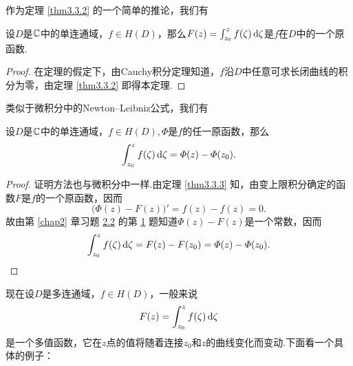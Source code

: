 作为定理 \ref{thm3.3.2} 的一个简单的推论，我们有
\begin{theorem}\label{thm3.3.3}
  设$D$是$\mathbb C$中的单连通域，$f\in H(D)$，那么$F(z)=\int_{z_0}^zf(\zeta)\mathop{}\!\mathrm{d} \zeta$是$f$在$D$中的一个原函数.
\end{theorem}
\begin{proof}
  在定理的假定下，由Cauchy积分定理知道，$f$沿$D$中任意可求长闭曲线的积分为零，由定理 \ref{thm3.3.2} 即得本定理.
\end{proof}

类似于微积分中的Newton--Leibniz公式，我们有
\begin{theorem}\label{thm3.3.4}
  设$D$是$\mathbb C$中的单连通域，$f\in H(D),\varPhi$是$f$的任一原函数，那么
  \[
    \int_{z_0}^zf(\zeta)\mathop{}\!\mathrm{d} \zeta = \varPhi(z)-\varPhi(z_0).
  \]
\end{theorem}
\begin{proof}
  证明方法也与微积分中一样.由定理 \ref{thm3.3.3} 知，由变上限积分确定的函数$F$是$f$的一个原函数，因而
  \[
    \big(\varPhi(z) - F(z)\big)' = f(z) - f(z) = 0.
  \]
  故由第 \ref{chap2} 章习题 \hyperlink{xiti2.2}{2.2} 的第 \hyperlink{xiti2.2.1}{1} 题知道$\varPhi(z)-F(z)$是一个常数，因而
  \begin{equation*}
    \int_{z_0}^zf(\zeta)\mathop{}\!\mathrm{d} \zeta = F(z) - F(z_0) = \varPhi(z) - \varPhi(z_0). \qedhere
  \end{equation*}
\end{proof}

现在设$D$是多连通域，$f\in H(D)$，一般来说
  \[
    F(z) = \int_{z_0}^zf(\zeta)\mathop{}\!\mathrm{d} \zeta
  \]
是一个多值函数，它在$z$点的值将随着连接$z_0$和$z$的曲线变化而变动.下面看一个具体的例子：

